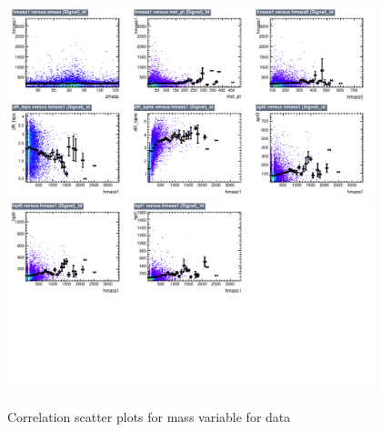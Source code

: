 \begin{figure}[!htb]%
\centering
\includegraphics[width=0.95\textwidth]{figures/CRDY/dataset/plots/correlationscatter_hmass1__Id_c1.pdf}
\includegraphics[width=0.95\textwidth]{figures/CRDY/dataset/plots/correlationscatter_hmass1__Id_c2.pdf}
\caption{ Correlation scatter plots for \HBB mass  variable for data}%
\label{fig:correlations_CRDY_hmass1_S}                                                       
\end{figure}


